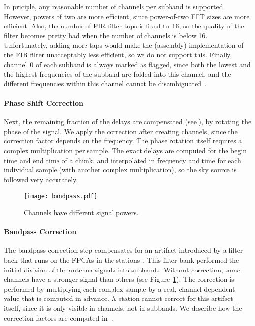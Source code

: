 In priciple, any reasonable number of channels per subband is supported.
However, powers of two are more efficient, since power-of-two FFT sizes
are more efficient.
Also, the number of FIR filter taps is fixed to~16, so the quality of the
filter becomes pretty bad when the number of channels is below 16.
Unfortunately, adding more taps would make the (assembly) implementation
of the FIR filter unacceptably less efficient, so we do not support this.
Finally, channel~0 of each subband is always marked as flagged, since both
the lowest and the highest frequencies of the subband are folded into this
channel, and the different frequencies within this channel cannot be
disambiguated~\cite{Romein:08}.


\paragraph{Phase Shift Correction }
\label{sec:phase-rotation}
Next, the remaining fraction of the delays are compensated (see
), by rotating the phase of the signal.
We apply the correction after creating channels, since the correction factor
depends on the frequency.
The phase rotation itself requires a complex multiplication per sample.
The exact delays are computed for the begin time and end time of a chunk,
and interpolated in frequency and time for each individual sample (with
another complex multiplication), so the sky source is followed very accurately.


\begin{figure}
\vspace{-6mm}
\texttt{[image: bandpass.pdf]}
\caption{Channels have different signal powers.}
\label{fig:bandpass}
\end{figure}
\paragraph{Bandpass Correction }
The bandpass correction step compensates for an artifact introduced by a
filter back that runs on the FPGAs in the stations~\cite{Kooistra:10}.
This filter bank performed the initial division of the antenna signals into
subbands.
Without correction, some channels have a stronger signal than others
(see Figure~\ref{fig:bandpass}).
The correction is performed by multiplying each complex sample by a real,
channel-dependent value that is computed in advance.
A station cannot correct for this artifact itself, since it is only visible
in channels, not in subbands.
We describe how the correction factors are computed in~\cite{Romein:08}.


